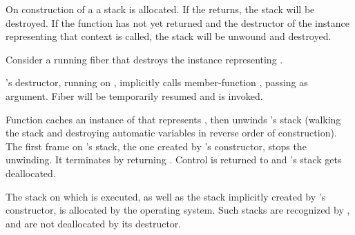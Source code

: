 \label{destruction}

On construction of a \fiber a stack is allocated. If the \entryfn returns,
the stack will be destroyed. If the function has not yet returned and the
destructor of the \fiber instance representing that context is called,
the stack will be unwound and destroyed.

Consider a running fiber  that destroys the \fiber instance
representing .

's destructor, running on , implicitly calls member-function
\resumewith, passing \unwindfib as
argument. Fiber  will be temporarily resumed and \unwindfib is
invoked.

Function \unwindfib caches an instance of \fiber that
represents , then unwinds 's stack
(walking the stack and destroying automatic variables in reverse order of
construction).
The first frame on 's stack, the one created by \fiber's constructor,
stops the unwinding. It terminates  by returning
. Control is returned to  and 's
stack gets deallocated.

The stack on which \main is executed, as well as the stack implicitly
created by \thread's constructor, is allocated by the operating
system. Such stacks are recognized by \fiber, and are not deallocated by its
destructor.
